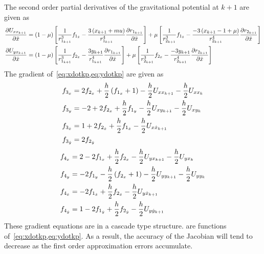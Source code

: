 \documentclass[letterpaper, preprint, paper,11pt]{AAS}	%
\begin{document}
The second order partial derivatives of the gravitational potential at \( k+1\) are given as
\begin{subequations}
\begin{align}
	\frac{\partial U_{xx_{k+1}}}{\partial \bar{x}} &= \left( 1-\mu \right)\left[ \frac{1}{r_{1_{k+1}}^3} f_{1_{\bar{x}}} - \frac{3 \left( x_{k+1} +mu \right)}{r_{1_{k+1}}^4} \frac{\partial r_{1_{k+1}}}{\partial \bar{x}} \right] + \mu \left[ \frac{1}{r_{2_{k+1}}^3} f_{1_{\bar{x}}} - \frac{-3 \left( x_{k+1} -1 + \mu \right)}{r_{2_{k+1}}^4} \frac{\partial r_{2_{k+1}}}{\partial \bar{x}} \right] \\
	\frac{\partial U_{yx_{k+1}}}{\partial \bar{x}} &= \left( 1-\mu \right)\left[ \frac{1}{r_{1_{k+1}}^3} f_{2_{\bar{x}}} - \frac{3 y_{k+1}}{r_{1_{k+1}}^4} \frac{\partial r_{1_{k+1}}}{\partial \bar{x}} \right] + \mu \left[ \frac{1}{r_{2_{k+1}}^3} f_{2_{\bar{x}}} - \frac{-3 y_{k+1}}{r_{2_{k+1}}^4} \frac{\partial r_{2_{k+1}}}{\partial \bar{x}} \right] 
\end{align}
\end{subequations}
The gradient of~\cref{eq:xdotkp,eq:ydotkp} are given as
\begin{subequations}\label{eq:xdotkp_grad}
\begin{align}
	f_{3_x} &= 2 f_{2_x} + \frac{h}{2} \left( f_{1_x} + 1 \right) - \frac{h}{2} U_{xx_{k+1}} - \frac{h}{2} U_{xx_k} \\
	f_{3_y} &= -2 + 2 f_{2_x} + \frac{h}{2} f_{1_y} - \frac{h}{2} U_{xy_{k+1}} -\frac{h}{2} U_{xy_{k}} \\
	f_{3_{\dot{x}}} &= 1 + 2 f_{2_{\dot{x}}} + \frac{h}{2} f_{1_{\dot{x}}} - \frac{h}{2} U_{x\dot{x}_{k+1}}\\
	f_{3_{\dot{y}}} &= 2 f_{2_{\dot{y}}}
\end{align}
\end{subequations}
\begin{subequations}\label{eq:ydotkp_grad}
\begin{align}
	f_{4_x} &= 2 - 2 f_{1_x} + \frac{h}{2} f_{2_x}  - \frac{h}{2} U_{yx_{k+1}} - \frac{h}{2} U_{yx_k} \\
	f_{4_y} &= -2f_{1_y}  - \frac{h}{2} \left( f_{2_x} + 1 \right) - \frac{h}{2} U_{yy_{k+1}} -\frac{h}{2} U_{yy_{k}} \\
	f_{4_{\dot{x}}} &= - 2 f_{1_{\dot{x}}} +  \frac{h}{2} f_{2_{\dot{x}}} - \frac{h}{2} U_{y\dot{x}_{k+1}}\\
	f_{4_{\dot{y}}} &= 1 - 2 f_{1_{\dot{y}}} + \frac{h}{2} f_{2_{\dot{y}}} - \frac{h}{2} U_{y\dot{y}_{k+1}}
\end{align}
\end{subequations}
These gradient equations are in a cascade type structure.
 are functions of~\cref{eq:xdotkp,eq:ydotkp}.
As a result, the accuracy of the Jacobian will tend to decrease as the first order approximation errors accumulate.
\end{document}

